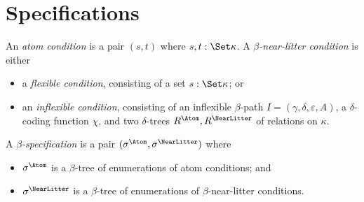 \section{Specifications}
\begin{definition}
  \label{def:Spec}
  An \emph{atom condition} is a pair \( (s, t) \) where \( s, t : \Set \kappa \).
  A \emph{\( \beta \)-near-litter condition} is either
  \begin{itemize}
    \item a \emph{flexible condition}, consisting of a set \( s : \Set \kappa \); or
    \item an \emph{inflexible condition}, consisting of an inflexible \( \beta \)-path \( I = (\gamma,\delta,\varepsilon,A) \), a \( \delta \)-coding function \( \chi \), and two \( \delta \)-trees \( R^\Atom, R^\NearLitter \) of relations on \( \kappa \).
  \end{itemize}
  A \emph{\( \beta \)-specification} is a pair \( (\sigma^\Atom, \sigma^\NearLitter) \) where
  \begin{itemize}
    \item \( \sigma^\Atom \) is a \( \beta \)-tree of enumerations of atom conditions; and
    \item \( \sigma^\NearLitter \) is a \( \beta \)-tree of enumerations of \( \beta \)-near-litter conditions.
  \end{itemize}
\end{definition}
